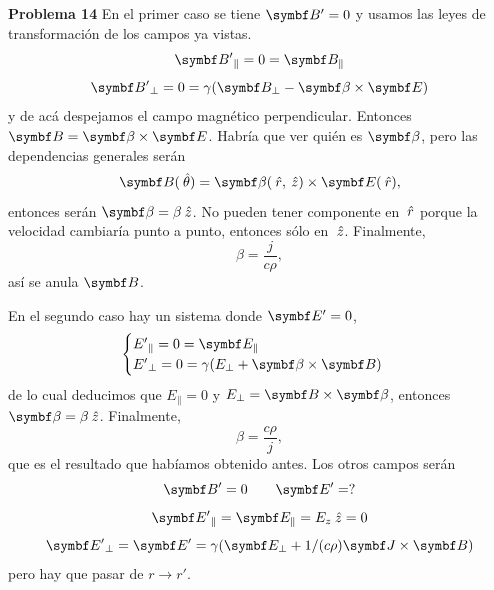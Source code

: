 \documentclass[10pt,oneside]{CBFT_book}
\begin{document}
\begin{ejemplo}{\bf Problema 14}
En el primer caso se tiene $\vb{B'} = 0 $ y usamos las leyes de transformación de los campos ya
vistas.
\[
	\vb{B'}_\parallel = 0 = \vb{B}_\parallel 
\]
\[
	\vb{B'}_\perp = 0 = \gamma ( \vb{B}_\perp - \pv{\beta}{E} )
\]
y de acá despejamos el campo magnético perpendicular. Entonces $ \vb{B} = \pv{\beta}{E} $.
Habría que ver quién es $\vb{\beta}$, pero las dependencias generales serán
\[
	\vb{B}(\thetaver) = \vb{\beta}(\rver,\zver) \times \vb{E}(\rver),
\]
entonces serán $ \vb{\beta} = \beta \zver $. No pueden tener componente en $\:\hat{r}$ porque
la velocidad cambiaría punto a punto, entonces sólo en $\:\hat{z}$.
Finalmente,
\[
	\beta = \frac{ j }{ c \rho },
\]
así se anula $\vb{B}$.

En el segundo caso hay un sistema donde $\vb{E'} = 0$,
\[
	\begin{cases}
	{E'}_\parallel = 0 = \vb{E}_\parallel \\
	{E'}_\perp = 0 = \gamma ( E_\perp + \vb{\beta} \times \vb{B} ) 
	\end{cases}
\]
de lo cual deducimos que $ E_{\parallel} = 0 $ y $ E_\perp = \vb{B} \times \vb{\beta} $,
entonces $ \vb{\beta} = \beta \zver $.
Finalmente,
\[
	\beta = \frac{ c \rho }{ j },
\]
que es el resultado que habíamos obtenido antes.
Los otros campos serán
\[
	\vb{B'} = 0 \qquad \vb{E'} = ?
\]
\[
	\vb{E'}_\parallel = \vb{E}_\parallel = E_z \zver = 0
\]
\[
	\vb{E'}_\perp = \vb{E'} = \gamma ( \vb{E}_\perp + 1/(c\rho) \pv{J}{B} ) 
\]
pero hay que pasar de $r \to r'$.
 
\end{ejemplo}
\end{document}

